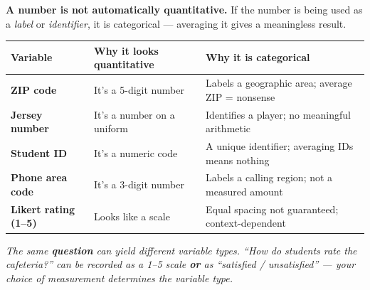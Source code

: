 \documentclass[aspectratio=169, 11pt]{beamer}
\begin{document}
{
\begin{frame}[t, plain]
  \hspace{0.4cm}%
  \begin{minipage}{0.93\textwidth}
    \vspace{0.3em}
    \small
    \textbf{\color{redacc}A number is not automatically quantitative.}
    If the number is being used as a \textit{label} or \textit{identifier},
    it is categorical --- averaging it gives a meaningless result.

    \vspace{0.6em}

    \setlength{\tabcolsep}{8pt}
    \renewcommand{\arraystretch}{1.7}
    \begin{tabular}{@{} >{\bfseries\color{navy}}p{}
                        p{}
                        p{} @{}}
      \rowcolor{sky}
      Variable & Why it looks quantitative & Why it is categorical \\
      \midrule
      ZIP code       & It's a 5-digit number  & Labels a geographic area; average ZIP = nonsense \\
      Jersey number  & It's a number on a uniform & Identifies a player; no meaningful arithmetic \\
      Student ID     & It's a numeric code    & A unique identifier; averaging IDs means nothing \\
      Phone area code & It's a 3-digit number & Labels a calling region; not a measured amount \\
      Likert rating (1--5) & Looks like a scale & Equal spacing not guaranteed; context-dependent \\
    \end{tabular}

    \vspace{0.5em}
    \footnotesize\color{slate}
    \textit{The same \textbf{question} can yield different variable types.
    ``How do students rate the cafeteria?''
    can be recorded as a 1--5 scale \textbf{or} as ``satisfied / unsatisfied'' ---
    your choice of measurement determines the variable type.}
  \end{minipage}
\end{frame}
}
\end{document}
